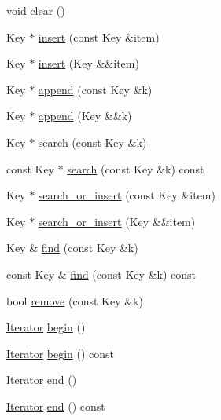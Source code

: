 \begin{DoxyCompactItemize}
\item 
void \hyperlink{class_designar_1_1_hash_set_a9f2acc5d38a16b2bfe8586ecea9d2df7}{clear} ()
\item 
Key $\ast$ \hyperlink{class_designar_1_1_hash_set_af4014286f5665c9e1c149bd2f4225535}{insert} (const Key \&item)
\item 
Key $\ast$ \hyperlink{class_designar_1_1_hash_set_ac18e38933ad6611da769ad878062cfb4}{insert} (Key \&\&item)
\item 
Key $\ast$ \hyperlink{class_designar_1_1_hash_set_a6ce31d6797f5f864b9a6906b6a1b9eb6}{append} (const Key \&k)
\item 
Key $\ast$ \hyperlink{class_designar_1_1_hash_set_a12748f202f35b968b2aace2ebe202f17}{append} (Key \&\&k)
\item 
Key $\ast$ \hyperlink{class_designar_1_1_hash_set_a4c374f62530fe151b47e42ed05ddc7fb}{search} (const Key \&k)
\item 
const Key $\ast$ \hyperlink{class_designar_1_1_hash_set_a6cd71f72b1676aa364e4aab6687b115b}{search} (const Key \&k) const
\item 
Key $\ast$ \hyperlink{class_designar_1_1_hash_set_abb9cb610eed9832735c6f0bcafbb1dea}{search\+\_\+or\+\_\+insert} (const Key \&item)
\item 
Key $\ast$ \hyperlink{class_designar_1_1_hash_set_a9ecd2f2a1e299cc35e90c66c8357beff}{search\+\_\+or\+\_\+insert} (Key \&\&item)
\item 
Key \& \hyperlink{class_designar_1_1_hash_set_a96df362356788b6f3f1261a526a1fd82}{find} (const Key \&k)
\item 
const Key \& \hyperlink{class_designar_1_1_hash_set_a10f079f500c953b61d77263f3b6c68ca}{find} (const Key \&k) const
\item 
bool \hyperlink{class_designar_1_1_hash_set_a860a955a91a4844cf691b0a47f84a565}{remove} (const Key \&k)
\item 
\hyperlink{class_designar_1_1_hash_set_1_1_iterator}{Iterator} \hyperlink{class_designar_1_1_hash_set_a4fd373db1c3035e5833b59fb6cb1656b}{begin} ()
\item 
\hyperlink{class_designar_1_1_hash_set_1_1_iterator}{Iterator} \hyperlink{class_designar_1_1_hash_set_a5b52ed8084a3a6e9c97dd90f690cf520}{begin} () const
\item 
\hyperlink{class_designar_1_1_hash_set_1_1_iterator}{Iterator} \hyperlink{class_designar_1_1_hash_set_ab3be22892d61b954068510bbdd6f6df8}{end} ()
\item 
\hyperlink{class_designar_1_1_hash_set_1_1_iterator}{Iterator} \hyperlink{class_designar_1_1_hash_set_ae136c18f4602ec2053a4c73b8c5c5946}{end} () const
\end{DoxyCompactItemize}
